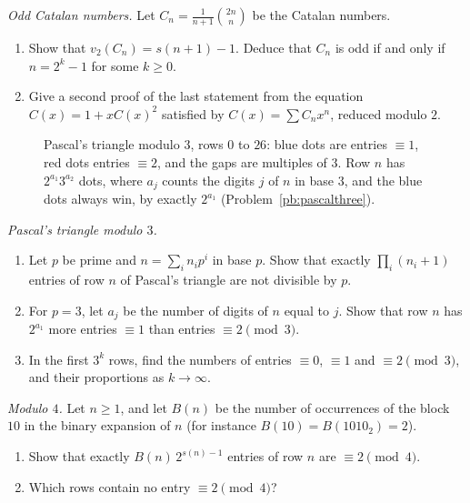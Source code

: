 \begin{exercise}[$\star\star$]\label{pb:catalanodd}
\emph{Odd Catalan numbers.} Let $C_n=\frac1{n+1}\binom{2n}n$ be the Catalan numbers.
\begin{enumerate}[label=(\alph*)]
\item Show that $v_2(C_n)=s(n+1)-1$. Deduce that $C_n$ is odd if and only if $n=2^k-1$ for some $k\ge0$.
\item Give a second proof of the last statement from the equation $C(x)=1+xC(x)^2$ satisfied by $C(x)=\sum C_nx^n$, reduced
modulo $2$.
\end{enumerate}
\end{exercise}

\begin{figure}[ht]
\centering
{}
\caption{Pascal's triangle modulo $3$, rows $0$ to $26$: blue dots are entries $\equiv1$, red dots entries $\equiv2$, and the gaps
are multiples of $3$. Row $n$ has $2^{a_1}3^{a_2}$ dots, where $a_j$ counts the digits $j$ of $n$ in base $3$, and the blue dots
always win, by exactly $2^{a_1}$ (Problem~\ref{pb:pascalthree}).}
\label{fig:pascal3}
\end{figure}

\begin{exercise}[$\star\star$]\label{pb:pascalthree}
\emph{Pascal's triangle modulo $3$.}
\begin{enumerate}[label=(\alph*)]
\item Let $p$ be prime and $n=\sum_in_ip^i$ in base $p$. Show that exactly $\prod_i(n_i+1)$ entries of row $n$ of Pascal's triangle
are not divisible by $p$.
\item For $p=3$, let $a_j$ be the number of digits of $n$ equal to $j$. Show that row $n$ has $2^{a_1}$ more entries $\equiv1$ than
entries $\equiv2\pmod3$.
\item In the first $3^k$ rows, find the numbers of entries $\equiv0$, $\equiv1$ and $\equiv2\pmod3$, and their proportions as
$k\to\infty$.
\end{enumerate}
\end{exercise}

\begin{exercise}[$\star\star$]\label{pb:pascalfour}
\emph{Modulo $4$.} Let $n\ge1$, and let $B(n)$ be the number of occurrences of the block $10$ in the binary expansion of $n$
(for instance $B(10)=B(1010_2)=2$).
\begin{enumerate}[label=(\alph*)]
\item Show that exactly $B(n)\,2^{s(n)-1}$ entries of row $n$ are $\equiv2\pmod4$.
\item Which rows contain no entry $\equiv2\pmod4$?
\end{enumerate}
\end{exercise}

